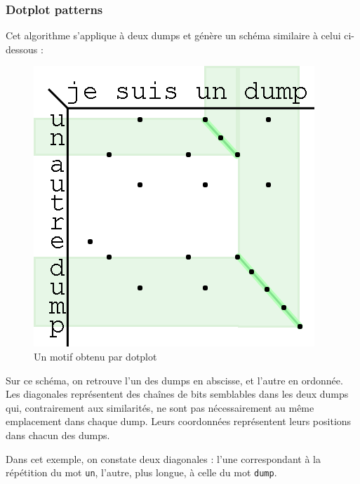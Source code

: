\subsubsection{Dotplot patterns}

Cet algorithme s'applique à deux dumps et génère un schéma similaire à celui ci-dessous :

\begin{figure}[!h]
  \begin{center}
  \includegraphics[scale=1]{res/04-2-dotplot.png}
  \caption{Un motif obtenu par dotplot}
  \label{04-1-dotplot}
  \end{center}
\end{figure}

Sur ce schéma, on retrouve l'un des dumps en abscisse, et l'autre en ordonnée. Les diagonales représentent des chaînes de bits semblables dans les deux dumps qui, contrairement aux similarités, ne sont pas nécessairement au même emplacement dans chaque dump. Leurs coordonnées représentent leurs positions dans chacun des dumps.

Dans cet exemple, on constate deux diagonales : l'une correspondant à la répétition du mot \texttt{un}, l'autre, plus longue, à celle du mot \texttt{dump}.
